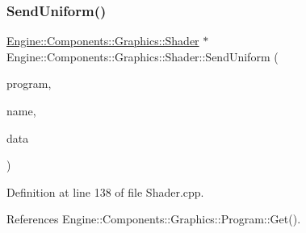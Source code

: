 \subsubsection{\texorpdfstring{Send\+Uniform()}{SendUniform()}\hspace{0.1cm}{\footnotesize\ttfamily [4/6]}}
{\footnotesize\ttfamily \mbox{\hyperlink{classEngine_1_1Components_1_1Graphics_1_1Shader}{Engine\+::\+Components\+::\+Graphics\+::\+Shader}} $\ast$ Engine\+::\+Components\+::\+Graphics\+::\+Shader\+::\+Send\+Uniform (\begin{DoxyParamCaption}\item[{\mbox{\hyperlink{classEngine_1_1Components_1_1Graphics_1_1Program}{Program}} $\ast$}]{program,  }\item[{const G\+Lchar $\ast$}]{name,  }\item[{float $\ast$}]{data }\end{DoxyParamCaption})}



Definition at line 138 of file Shader.\+cpp.



References Engine\+::\+Components\+::\+Graphics\+::\+Program\+::\+Get().


